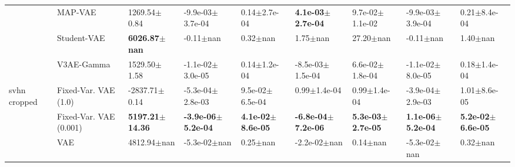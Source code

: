 \begin{tabular}{lllllllll}
             & MAP-VAE &            1269.54$\pm$0.84 &           -9.9e-03$\pm$3.7e-04 &              0.14$\pm$2.7e-04 &   \textbf{4.1e-03$\pm$2.7e-04} &           9.7e-02$\pm$1.1e-02 &          -9.9e-03$\pm$3.9e-04 &              0.21$\pm$8.4e-04 \\
             & Student-VAE &    \textbf{6026.87$\pm$nan} &                  -0.11$\pm$nan &                  0.32$\pm$nan &                   1.75$\pm$nan &                 27.20$\pm$nan &                 -0.11$\pm$nan &                  1.40$\pm$nan \\
             & V3AE-Gamma &            1529.50$\pm$1.58 &           -1.1e-02$\pm$3.0e-05 &              0.14$\pm$1.2e-04 &           -8.5e-03$\pm$1.5e-04 &           6.6e-02$\pm$1.8e-04 &          -1.1e-02$\pm$8.0e-05 &              0.18$\pm$1.4e-04 \\
svhn cropped & Fixed-Var. VAE (1.0) &           -2837.71$\pm$0.14 &           -5.3e-04$\pm$2.8e-03 &           9.5e-02$\pm$6.5e-04 &               0.99$\pm$1.4e-04 &              0.99$\pm$1.4e-04 &          -3.9e-04$\pm$2.9e-03 &              1.01$\pm$8.6e-05 \\
             & Fixed-Var. VAE (0.001) &  \textbf{5197.21$\pm$14.36} &  \textbf{-3.9e-06$\pm$5.2e-04} &  \textbf{4.1e-02$\pm$8.6e-05} &  \textbf{-6.8e-04$\pm$7.2e-06} &  \textbf{5.3e-03$\pm$2.7e-05} &  \textbf{1.1e-06$\pm$5.2e-04} &  \textbf{5.2e-02$\pm$6.6e-05} \\
             & VAE &             4812.94$\pm$nan &               -5.3e-02$\pm$nan &                  0.25$\pm$nan &               -2.2e-02$\pm$nan &                  0.14$\pm$nan &              -5.3e-02$\pm$nan &                  0.32$\pm$nan \\
\bottomrule
\end{tabular}

